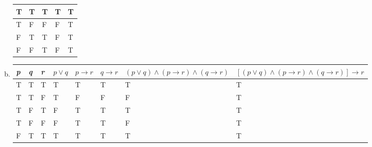 \begin{itemize}
\begin{enumerate}[a.]
\begin{tabular}{*{5}{|l}|}
                        \hline
                        T          & T          & T         & T                   & T                           \\
                        \hline
                        T          & F          & F         & F                   & T                           \\
                        \hline
                        F          & T          & T         & F                   & T                           \\
                        \hline
                        F          & F          & T         & F                   & T                           \\
                        \hline
                    \end{tabular}
                    \newpage
              \item
                    \begin{tabular}{*{6}{|l} *{2}{|p{3.2cm}}|}
                        \hline
                        \textit{p} & \textit{q} & \textit{r} & $p \lor q$ & $p \to r$ & $q \to r$ & $(p \lor q) \land (p \to r) \land (q \to r) $ & $[(p \lor q) \land (p \to r) \land (q \to r)] \to r$
                        \\
                        \hline
                        T          & T          & T          & T          & T         & T         & T                                              & T                                                    \\
                        \hline
                        T          & T          & F          & T          & F         & F         & F                                              & T                                                    \\
                        \hline
                        T          & F          & T          & F          & T         & T         & T                                              & T                                                    \\
                        \hline
                        T          & F          & F          & F          & T         & T         & F                                              & T                                                    \\
                        \hline
                        F          & T          & T          & T          & T         & T         & T                                              & T                                                    \\

\end{tabular}
\end{enumerate}
\end{itemize}

